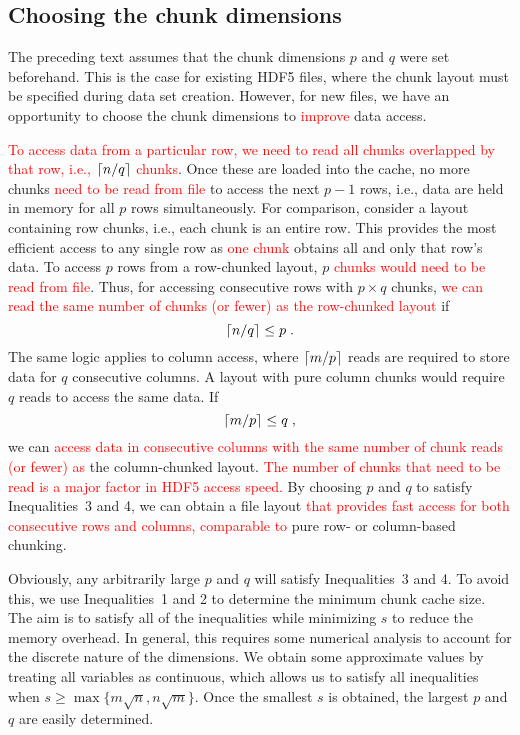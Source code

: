 \documentclass{article}
\newcommand{\revised}[1]{\textcolor{red}{#1}}
\begin{document}

\subsection{Choosing the chunk dimensions}
The preceding text assumes that the chunk dimensions $p$ and $q$ were set beforehand.
This is the case for existing HDF5 files, where the chunk layout must be specified during data set creation.
However, for new files, we have an opportunity to choose the chunk dimensions to \revised{improve} data access.

\revised{To access data from a particular row, we need to read all chunks overlapped by that row, i.e., $\left \lceil n/q \right \rceil$ chunks}.
Once these are loaded into the cache, no more chunks \revised{need to be read from file} to access the next $p-1$ rows, i.e., data are held in memory for all $p$ rows simultaneously.
For comparison, consider a layout containing row chunks, i.e., each chunk is an entire row.
This provides the most efficient access to any single row as \revised{one chunk} obtains all and only that row's data.
To access $p$ rows from a row-chunked layout, $p$ \revised{chunks would need to be read from file}.
Thus, for accessing consecutive rows with $p \times q$ chunks, \revised{we can read the same number of chunks (or fewer) as the row-chunked layout} if 
\begin{equation}
\left \lceil n/q \right \rceil \le p \;.
\end{equation}
The same logic applies to column access, where $\left \lceil m/p \right \rceil$ reads are required to store data for $q$ consecutive columns.
A layout with pure column chunks would require $q$ reads to access the same data.
If 
\begin{equation}
\left \lceil m/p \right \rceil \le q \;,
\end{equation}
we can \revised{access data in consecutive columns with the same number of chunk reads (or fewer) as} the column-chunked layout. 
\revised{The number of chunks that need to be read is a major factor in HDF5 access speed.}
By choosing $p$ and $q$ to satisfy Inequalities~3 and 4, we can obtain a file layout \revised{that provides fast access for both consecutive rows and columns, comparable to} pure row- or column-based chunking.

Obviously, any arbitrarily large $p$ and $q$ will satisfy Inequalities~3 and 4.
To avoid this, we use Inequalities~1 and 2 to determine the minimum chunk cache size.
The aim is to satisfy all of the inequalities while minimizing $s$ to reduce the memory overhead.
In general, this requires some numerical analysis to account for the discrete nature of the dimensions.
We obtain some approximate values by treating all variables as continuous, which allows us to satisfy all inequalities when $s \ge \max\{m\sqrt{n}, n\sqrt{m}\}$.
Once the smallest $s$ is obtained, the largest $p$ and $q$ are easily determined.
\end{document}

